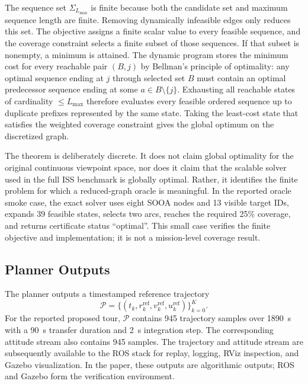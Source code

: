 \begin{IEEEproof}[Sketch]
The sequence set $\Sigma_{L_{\max}}$ is finite because both the candidate set
and maximum sequence length are finite. Removing dynamically infeasible edges
only reduces this set. The objective assigns a finite scalar value to every
feasible sequence, and the coverage constraint selects a finite subset of
those sequences. If that subset is nonempty, a minimum is attained. The dynamic
program stores the minimum cost for every reachable pair $(B,j)$ by Bellman's
principle of optimality: any optimal sequence ending at $j$ through selected
set $B$ must contain an optimal predecessor sequence ending at some
$a\in B\setminus\{j\}$. Exhausting all reachable states of cardinality
$\le L_{\max}$ therefore evaluates every feasible ordered sequence up to
duplicate prefixes represented by the same state. Taking the least-cost state
that satisfies the weighted coverage constraint gives the global optimum on
the discretized graph.
\end{IEEEproof}

The theorem is deliberately discrete. It does not claim global optimality for
the original continuous viewpoint space, nor does it claim that the scalable
solver used in the full ISS benchmark is globally optimal. Rather, it
identifies the finite problem for which a reduced-graph oracle is meaningful.
In the reported oracle smoke case, the exact solver uses eight SOOA nodes and
13 visible target IDs, expands 39 feasible states, selects two arcs, reaches
the required 25\% coverage, and returns certificate status ``optimal''. This
small case verifies the finite objective and implementation; it is not a
mission-level coverage result.

\subsection{Planner Outputs}

The planner outputs a timestamped reference trajectory
\begin{equation}
  \mathcal{P} =
  \{(t_k,r_k^{\mathrm{ref}},v_k^{\mathrm{ref}},u_k^{\mathrm{ref}})\}_{k=0}^{K}.
\end{equation}
For the reported proposed tour, $\mathcal{P}$ contains 945 trajectory samples
over 1890~s with a 90~s transfer duration and 2~s integration step. The
corresponding attitude stream also contains 945 samples. The trajectory and
attitude stream are subsequently available to the ROS stack for replay,
logging, RViz inspection, and Gazebo visualization. In the paper, these outputs
are algorithmic outputs; ROS and Gazebo form the verification environment.
